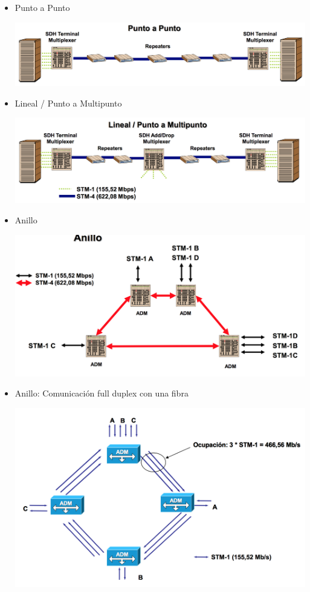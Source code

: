 \documentclass[10pt,portrait, twocolumn]{article}
\begin{document}
\begin{itemize}
	\item Punto a Punto
		\begin{center}
			\includegraphics[scale=0.2]{images/SDHP2P}
		\end{center}
	\item Lineal / Punto a Multipunto
		\begin{center}
			\includegraphics[scale=0.2]{images/SDHMulti}
		\end{center}
	\item Anillo
		\begin{center}
			\includegraphics[scale=0.2]{images/SDHAnillo}
		\end{center}
	\item Anillo: Comunicación full duplex con una fibra
		\begin{center}
			\includegraphics[scale=0.2]{images/SDHAnillo2}

\end{center}
\end{itemize}
\end{document}
